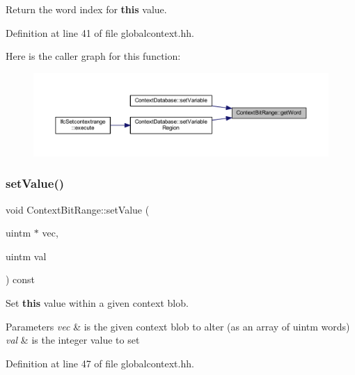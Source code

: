 Return the word index for {\bfseries{this}} value. 



Definition at line 41 of file globalcontext.\+hh.

Here is the caller graph for this function\+:
\nopagebreak
\begin{figure}[H]
\begin{center}
\leavevmode
\includegraphics[width=350pt]{class_context_bit_range_a95f4ce54e8e572278d51fce6e61a4cf1_icgraph}
\end{center}
\end{figure}
\mbox{\label{class_context_bit_range_a9aa57773da860d022bd8b1b2e59d1790}} 
\subsubsection{\texorpdfstring{setValue()}{setValue()}}
{\footnotesize\ttfamily void Context\+Bit\+Range\+::set\+Value (\begin{DoxyParamCaption}\item[{uintm $\ast$}]{vec,  }\item[{uintm}]{val }\end{DoxyParamCaption}) const\hspace{0.3cm}{\ttfamily [inline]}}



Set {\bfseries{this}} value within a given context blob. 


\begin{DoxyParams}{Parameters}
{\em vec} & is the given context blob to alter (as an array of uintm words) \\
\hline
{\em val} & is the integer value to set \\
\hline
\end{DoxyParams}


Definition at line 47 of file globalcontext.\+hh.

